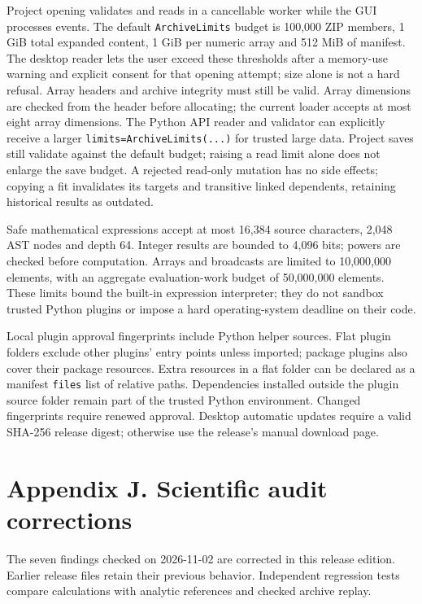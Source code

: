 \documentclass[
  10pt,
  a4paper,
  oneside]{scrreprt}
\begin{document}
Project opening validates and reads in a cancellable worker while the
GUI processes events. The default \texttt{ArchiveLimits} budget is
100,000 ZIP members, 1 GiB total expanded content, 1 GiB per numeric
array and 512 MiB of manifest. The desktop reader lets the user exceed
these thresholds after a memory-use warning and explicit consent for
that opening attempt; size alone is not a hard refusal. Array headers
and archive integrity must still be valid. Array dimensions are checked
from the header before allocating; the current loader accepts at most
eight array dimensions. The Python API reader and validator can
explicitly receive a larger \texttt{limits=ArchiveLimits(...)} for
trusted large data. Project saves still validate against the default
budget; raising a read limit alone does not enlarge the save budget. A
rejected read-only mutation has no side effects; copying a fit
invalidates its targets and transitive linked dependents, retaining
historical results as outdated.

Safe mathematical expressions accept at most 16,384 source characters,
2,048 AST nodes and depth 64. Integer results are bounded to 4,096 bits;
powers are checked before computation. Arrays and broadcasts are limited
to 10,000,000 elements, with an aggregate evaluation-work budget of
50,000,000 elements. These limits bound the built-in expression
interpreter; they do not sandbox trusted Python plugins or impose a hard
operating-system deadline on their code.

Local plugin approval fingerprints include Python helper sources. Flat
plugin folders exclude other plugins' entry points unless imported;
package plugins also cover their package resources. Extra resources in a
flat folder can be declared as a manifest \texttt{files} list of
relative paths. Dependencies installed outside the plugin source folder
remain part of the trusted Python environment. Changed fingerprints
require renewed approval. Desktop automatic updates require a valid
SHA-256 release digest; otherwise use the release's manual download
page.

\hypertarget{appendix-j.-scientific-audit-corrections}{%
\chapter{Appendix J. Scientific audit
corrections}\label{appendix-j.-scientific-audit-corrections}}

The seven findings checked on 2026-11-02 are corrected in this release
edition. Earlier release files retain their previous behavior.
Independent regression tests compare calculations with analytic
references and checked archive replay.
\end{document}
